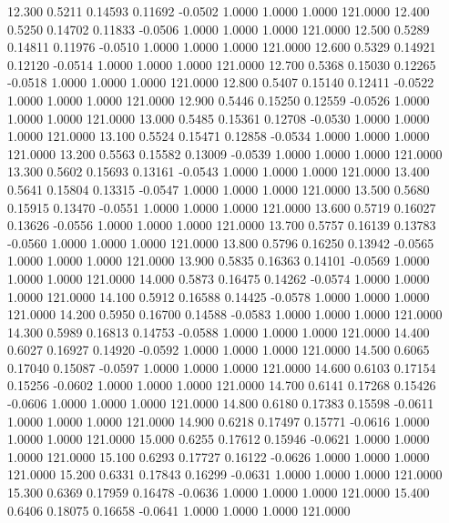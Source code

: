   12.300   0.5211   0.14593   0.11692  -0.0502   1.0000   1.0000   1.0000 121.0000
  12.400   0.5250   0.14702   0.11833  -0.0506   1.0000   1.0000   1.0000 121.0000
  12.500   0.5289   0.14811   0.11976  -0.0510   1.0000   1.0000   1.0000 121.0000
  12.600   0.5329   0.14921   0.12120  -0.0514   1.0000   1.0000   1.0000 121.0000
  12.700   0.5368   0.15030   0.12265  -0.0518   1.0000   1.0000   1.0000 121.0000
  12.800   0.5407   0.15140   0.12411  -0.0522   1.0000   1.0000   1.0000 121.0000
  12.900   0.5446   0.15250   0.12559  -0.0526   1.0000   1.0000   1.0000 121.0000
  13.000   0.5485   0.15361   0.12708  -0.0530   1.0000   1.0000   1.0000 121.0000
  13.100   0.5524   0.15471   0.12858  -0.0534   1.0000   1.0000   1.0000 121.0000
  13.200   0.5563   0.15582   0.13009  -0.0539   1.0000   1.0000   1.0000 121.0000
  13.300   0.5602   0.15693   0.13161  -0.0543   1.0000   1.0000   1.0000 121.0000
  13.400   0.5641   0.15804   0.13315  -0.0547   1.0000   1.0000   1.0000 121.0000
  13.500   0.5680   0.15915   0.13470  -0.0551   1.0000   1.0000   1.0000 121.0000
  13.600   0.5719   0.16027   0.13626  -0.0556   1.0000   1.0000   1.0000 121.0000
  13.700   0.5757   0.16139   0.13783  -0.0560   1.0000   1.0000   1.0000 121.0000
  13.800   0.5796   0.16250   0.13942  -0.0565   1.0000   1.0000   1.0000 121.0000
  13.900   0.5835   0.16363   0.14101  -0.0569   1.0000   1.0000   1.0000 121.0000
  14.000   0.5873   0.16475   0.14262  -0.0574   1.0000   1.0000   1.0000 121.0000
  14.100   0.5912   0.16588   0.14425  -0.0578   1.0000   1.0000   1.0000 121.0000
  14.200   0.5950   0.16700   0.14588  -0.0583   1.0000   1.0000   1.0000 121.0000
  14.300   0.5989   0.16813   0.14753  -0.0588   1.0000   1.0000   1.0000 121.0000
  14.400   0.6027   0.16927   0.14920  -0.0592   1.0000   1.0000   1.0000 121.0000
  14.500   0.6065   0.17040   0.15087  -0.0597   1.0000   1.0000   1.0000 121.0000
  14.600   0.6103   0.17154   0.15256  -0.0602   1.0000   1.0000   1.0000 121.0000
  14.700   0.6141   0.17268   0.15426  -0.0606   1.0000   1.0000   1.0000 121.0000
  14.800   0.6180   0.17383   0.15598  -0.0611   1.0000   1.0000   1.0000 121.0000
  14.900   0.6218   0.17497   0.15771  -0.0616   1.0000   1.0000   1.0000 121.0000
  15.000   0.6255   0.17612   0.15946  -0.0621   1.0000   1.0000   1.0000 121.0000
  15.100   0.6293   0.17727   0.16122  -0.0626   1.0000   1.0000   1.0000 121.0000
  15.200   0.6331   0.17843   0.16299  -0.0631   1.0000   1.0000   1.0000 121.0000
  15.300   0.6369   0.17959   0.16478  -0.0636   1.0000   1.0000   1.0000 121.0000
  15.400   0.6406   0.18075   0.16658  -0.0641   1.0000   1.0000   1.0000 121.0000

